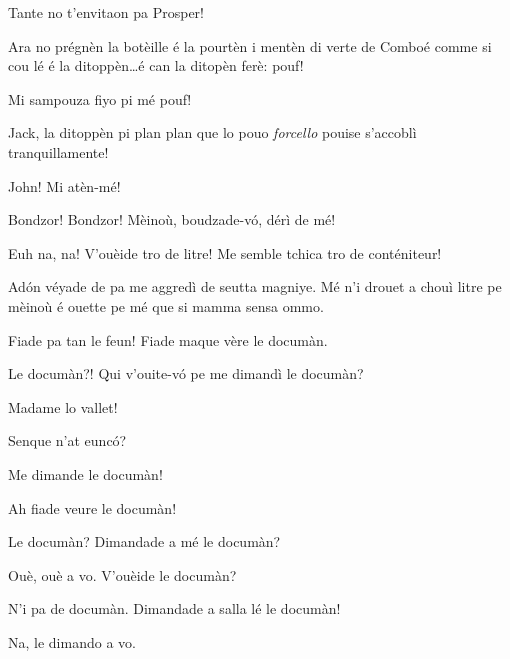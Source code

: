 \begin{drama}
\Jackspeaks Tante no t'envitaon pa Prosper!


\Jackspeaks Ara no prégnèn la botèille é la pourtèn i mentèn di verte de Comboé comme si cou lé é la ditoppèn\ldots é can la ditopèn ferè: pouf!

\Prosperospeaks Mi sampouza fiyo pi mé pouf!

\Johnspeaks Jack, la ditoppèn pi plan plan que lo pouo \textit{forcello} pouise s'accoblì tranquillamente! 


\Jackspeaks John! Mi atèn-mé!


\scene[-- 1000 litre!]


\Naimaspeaks{} Bondzor!  Bondzor! Mèinoù, boudzade-v\'o, dérì de mé!

\Prosperospeaks Euh na, na! V'ouèide tro de litre! Me semble tchica tro de conténiteur!

\Naimaspeaks Ad\'on véyade de pa me aggredì de seutta magniye. Mé n'i drouet a chouì litre pe mèinoù é ouette pe mé que si mamma sensa ommo.

\Prosperospeaks Fiade pa tan le feun! Fiade maque vère le documàn.

\Naimaspeaks Le documàn?! Qui v'ouite-v\'o pe me dimandì le documàn? 

\Prosperospeaks Madame lo vallet!


\Valletspeaks Senque n'at eunc\'o?

\Naimaspeaks Me dimande le documàn!

\Valletspeaks Ah fiade veure le documàn!

\Naimaspeaks Le documàn? Dimandade a mé le documàn?

\Valletspeaks Ouè, ouè a vo. V'ouèide le documàn?

\Naimaspeaks N'i pa de documàn. Dimandade a salla lé  le documàn!

\Valletspeaks Na, le dimando a vo.


\end{drama}
